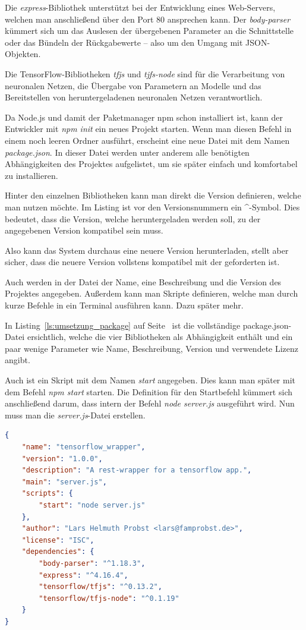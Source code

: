 Die \textit{express}-Bibliothek unterstützt bei der Entwicklung eines Web-Servers, welchen man anschließend über den
Port 80 ansprechen kann. Der \textit{body-parser} kümmert sich um das Auslesen der übergebenen Parameter an die
Schnittstelle oder das Bündeln der Rückgabewerte -- also um den Umgang mit JSON-Objekten.

Die TensorFlow-Bibliotheken \textit{tfjs} und \textit{tjfs-node} sind für die Verarbeitung von neuronalen Netzen,
die Übergabe von Parametern an Modelle und das Bereitstellen von heruntergeladenen neuronalen Netzen verantwortlich.

Da Node.js und damit der Paketmanager npm schon installiert ist, kann der Entwickler mit \textit{npm init} ein neues 
Projekt starten. Wenn man diesen Befehl in einem noch leeren Ordner ausführt, erscheint eine neue Datei mit dem Namen
\textit{package.json}. In dieser Datei werden unter anderem alle benötigten Abhängigkeiten des Projektes aufgelistet,
um sie später einfach und komfortabel zu installieren.

Hinter den einzelnen Bibliotheken kann man direkt die Version definieren, welche man nutzen möchte. Im Listing ist vor
den Versionsnummern ein \textbf{\^}-Symbol. Dies bedeutet, dass die Version, welche heruntergeladen werden soll, zu der
angegebenen Version kompatibel sein muss.

Also kann das System durchaus eine neuere Version herunterladen, stellt aber sicher, dass die neuere Version vollstens
kompatibel mit der geforderten ist.

Auch werden in der Datei der Name, eine Beschreibung und die Version des Projektes angegeben. Außerdem kann man Skripte
definieren, welche man durch kurze Befehle in ein Terminal ausführen kann. Dazu später mehr.

In Listing~\ref{ls:umsetzung_package} auf Seite~\pageref{ls:umsetzung_package} ist die vollständige package.json-Datei
ersichtlich, welche die vier Bibliotheken als Abhängigkeit enthält und ein paar wenige Parameter wie Name, Beschreibung,
Version und verwendete Lizenz angibt. 

Auch ist ein Skript mit dem Namen \textit{start} angegeben. Dies kann man später mit dem Befehl \textit{npm start}
starten. Die Definition für den Startbefehl kümmert sich anschließend darum, dass intern der Befehl
\textit{node server.js} ausgeführt wird. Nun muss man die \textit{server.js}-Datei erstellen.

\begin{lstlisting}[language=JSON, caption=Die komplette package.json, label=ls:umsetzung_package]
{
    "name": "tensorflow_wrapper",
    "version": "1.0.0",
    "description": "A rest-wrapper for a tensorflow app.",
    "main": "server.js",
    "scripts": {
        "start": "node server.js"
    },
    "author": "Lars Helmuth Probst <lars@famprobst.de>",
    "license": "ISC",
    "dependencies": {
        "body-parser": "^1.18.3",
        "express": "^4.16.4",
        "tensorflow/tfjs": "^0.13.2",
        "tensorflow/tfjs-node": "^0.1.19"
    }
}
\end{lstlisting}

